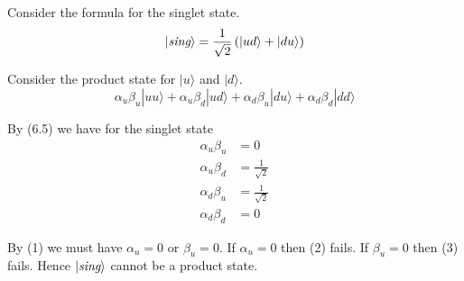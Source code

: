 


\bigskip
Consider the formula for the singlet state.
\begin{equation*}
|\text{\it sing}\rangle=\frac{1}{\sqrt2}\left(|ud\rangle+|du\rangle\right)
\end{equation*}

Consider the product state for $|u\rangle$ and $|d\rangle$.
\begin{equation*}
\alpha_u\beta_u|uu\rangle
+\alpha_u\beta_d|ud\rangle
+\alpha_d\beta_u|du\rangle
+\alpha_d\beta_d|dd\rangle
\tag{6.5}
\end{equation*}

By (6.5) we have for the singlet state
\begin{align*}
\alpha_u\beta_u&=0\tag{1}
\\[1ex]
\alpha_u\beta_d&=\frac{1}{\sqrt2}\tag{2}
\\[1ex]
\alpha_d\beta_u&=\frac{1}{\sqrt2}\tag{3}
\\[1ex]
\alpha_d\beta_d&=0\tag{4}
\end{align*}

By (1) we must have $\alpha_u=0$ or $\beta_u=0$.
If $\alpha_u=0$ then (2) fails.
If $\beta_u=0$ then (3) fails.
Hence $|\text{\it sing}\rangle$ cannot be a product state.


